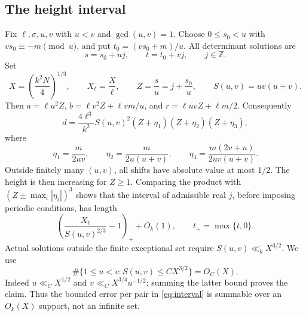 \documentclass[11pt,a4paper]{article}
\numberwithin{equation}{section}
\theoremstyle{remark}
\newcommand{\Z}{\mathbb Z}
\begin{document}
\subsection{The height interval}
Fix $\ell,\sigma,u,v$ with $u<v$ and $\gcd(u,v)=1$. Choose $0\le s_0<u$ with $vs_0\equiv-m\pmod u$, and put $t_0=(vs_0+m)/u$. All determinant solutions are
\[
s=s_0+uj,\qquad t=t_0+vj,\qquad j\in\Z.
\]
Set
\begin{equation}\label{eq:X}
X=\left(\frac{k^2N}{4}\right)^{1/3},\qquad
X_\ell=\frac X\ell,\qquad Z=\frac su=j+\frac{s_0}{u},\qquad S(u,v)=uv(u+v).
\end{equation}
Then $a=\ell u^2Z$, $b=\ell v^2Z+\ell vm/u$, and $r=\ell uvZ+\ell m/2$. Consequently
\begin{equation}\label{eq:height}
d=\frac{4\ell^3}{k^2}S(u,v)^2(Z+\eta_1)(Z+\eta_2)(Z+\eta_3),
\end{equation}
where
\begin{equation}\label{eq:etas}
\eta_1=\frac{m}{2uv},\qquad
\eta_2=\frac{m}{2u(u+v)},\qquad
\eta_3=\frac{m(2v+u)}{2uv(u+v)}.
\end{equation}
Outside finitely many $(u,v)$, all shifts have absolute value at most $1/2$. The height is then increasing for $Z\ge1$. Comparing the product with $(Z\pm\max_i|\eta_i|)^3$ shows that the interval of admissible real $j$, before imposing periodic conditions, has length
\begin{equation}\label{eq:interval}
\left(\frac{X_\ell}{S(u,v)^{2/3}}-1\right)_++O_k(1),\qquad t_+=\max\{t,0\}.
\end{equation}
Actual solutions outside the finite exceptional set require $S(u,v)\ll_k X^{3/2}$. We use
\begin{equation}\label{eq:support}
\#\{1\le u<v:S(u,v)\le CX^{3/2}\}=O_C(X).
\end{equation}
Indeed $u\ll_C X^{1/2}$ and $v\ll_C X^{3/4}u^{-1/2}$; summing the latter bound proves the claim. Thus the bounded error per pair in \eqref{eq:interval} is summable over an $O_k(X)$ support, not an infinite set.
\end{document}
